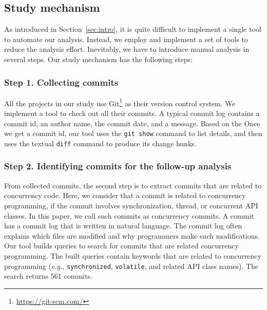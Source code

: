 \subsection{Study mechanism}
\label{sec:method:tool}
As introduced in Section~\ref{sec:intro}, it is quite difficult to implement a single tool to automate our analysis. Instead, we employ and implement a set of tools to reduce the analysis effort. Inevitably, we have to introduce manual analysis in several steps. Our study mechanism has the following steps:

\subsubsection{Step 1. Collecting commits} All the projects in our study use Git\footnote{\url{https://git-scm.com/}} as their version control system. We implement a tool to check out all their commits. A typical commit log contains a commit id, an author name, the commit date, and a message. Based on the Once we get a commit id, our tool uses the \texttt{git show} command to list details, and then uses the textual \texttt{diff} command to produce its change hunks.

\subsubsection{Step 2. Identifying commits for the follow-up analysis} From collected commits, the second step is to extract commits that are related to concurrency code. Here, we consider that a commit is related to concurrency programming, if the commit involves synchronization, thread, or concurrent API classes. In this paper, we call such commits as concurrency commits. A commit has a commit log that is written in natural language. The commit log often explains which files are modified and why programmers make such modifications. Our tool builds queries to search for commits that are related concurrency programming. The built queries contain keywords that are related to concurrency programming (\emph{e.g.}, \texttt{synchronized}, \texttt{volatile}, and related API class names). The search returns 561 commits.

